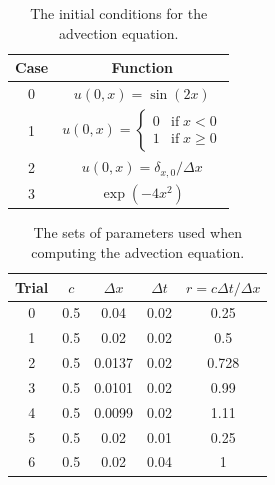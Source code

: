 \documentclass[twocolumn]{article}
\begin{document}
\begin{table}
\begin{centering}
\begin{tabular}{c|c}
  Case & Function \\ \hline \hline
  0    & $u(0, x) = \sin(2 x)$ \\ \hline
  1    & $u(0, x) = \begin{cases} 0 & \text{if} \; x < 0 \\ 1 &
    \text{if} \; x \geq 0 \end{cases}$ \\ \hline
  2    & $u(0, x) = \delta_{x, 0} / \Delta x$ \\ \hline
  3    & $\exp(- 4 x^2)$
\end{tabular}
\caption{The initial conditions for the advection equation.}
\label{table:cases}
\end{centering}
\end{table}

\begin{table}
\begin{centering}
\begin{tabular}{c|c|c|c|c}
  Trial & $c$ & $\Delta x$ & $\Delta t$ & $r = c \Delta t / \Delta x$ \\ \hline \hline
  0     & 0.5 & 0.04       & 0.02       & 0.25                        \\ \hline
  1     & 0.5 & 0.02       & 0.02       & 0.5                         \\ \hline
  2     & 0.5 & 0.0137     & 0.02       & 0.728                       \\ \hline
  3     & 0.5 & 0.0101     & 0.02       & 0.99                        \\ \hline
  4     & 0.5 & 0.0099     & 0.02       & 1.11                        \\ \hline
  5     & 0.5 & 0.02       & 0.01       & 0.25                        \\ \hline
  6     & 0.5 & 0.02       & 0.04       & 1
\end{tabular}
\caption{The sets of parameters used when computing the advection equation.}
\label{table:advection}
\end{centering}
\end{table}
\end{document}
